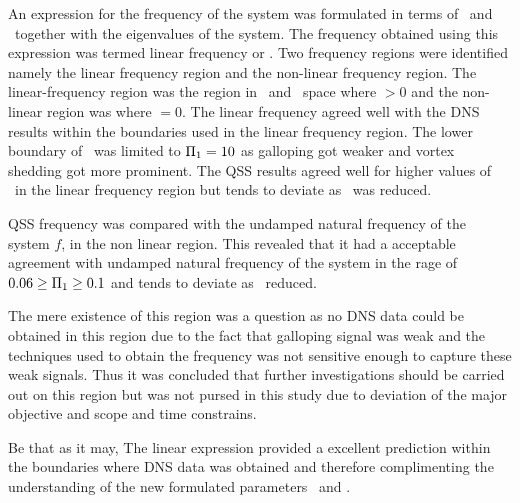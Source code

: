 An expression for the frequency of the system was formulated in terms of \massstiff\ and \massdamp\ together with the eigenvalues of the system. The frequency obtained using this expression was termed linear frequency or \freqlin. Two frequency regions were identified namely the linear frequency region and the non-linear frequency region. The linear-frequency region was the region in \massstiff\ and \massdamp\ space where \freqlin$>0$ and the non-linear region was where \freqlin$=0$. The linear frequency agreed well with the DNS results within the boundaries used in the linear frequency region. The lower boundary of \massstiff\ was limited to $\Pi_1=10$ as galloping got weaker and vortex shedding got more prominent. The QSS results agreed well for higher values of \massstiff\ in the linear frequency region but tends to deviate as \massstiff\ was reduced. 

QSS frequency was compared with the undamped natural frequency of the system $f$, in the non linear region. This revealed that it had a acceptable agreement with undamped natural frequency of the system in the rage of $0.06\geq\Pi_1\geq0.1$ and tends to deviate as \massstiff\ reduced. 

The mere existence of this region was a question as no DNS data could be obtained in this region due to the fact that galloping signal was weak and the techniques used to obtain the  frequency was not sensitive enough to capture these weak signals. Thus it was concluded that further investigations should be carried out on this region but was not pursed in this study due to deviation of the major objective and scope and time constrains.

Be that as it may, The linear expression provided a excellent prediction within the boundaries where DNS data was obtained and therefore complimenting the understanding of the new formulated parameters \massstiff\ and \massdamp.    



